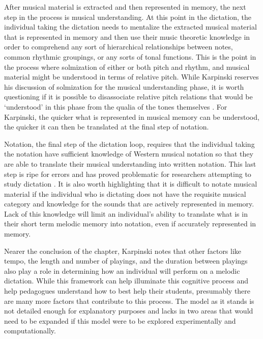 \documentclass[12pt,]{book}
\begin{document}
After musical material is extracted and then represented in memory, the next step in the process is musical understanding.
At this point in the dictation, the individual taking the dictation needs to mentalize the extracted musical material that is represented in memory and then use their music theoretic knowledge in order to comprehend any sort of hierarchical relationships between notes, common rhythmic groupings, or any sorts of tonal functions.
This is the point in the process where solmization of either or both pitch and rhythm, and musical material might be understood in terms of relative pitch.
While Karpinski reserves his discussion of solmization for the musical understanding phase, it is worth questioning if it is possible to disassociate relative pitch relations that would be `understood' in this phase from the qualia of the tones themselves \citep{arthurPerceptualStudyScaledegree2018}.
For Karpinski, the quicker what is represented in musical memory can be understood, the quicker it can then be translated at the final step of notation.

Notation, the final step of the dictation loop, requires that the individual taking the notation have sufficient knowledge of Western musical notation so that they are able to translate their musical understanding into written notation.
This last step is ripe for errors and has proved problematic for researchers attempting to study dictation \citep{taylorStrategiesMemoryShort1983, klonoskiImprovingDictationAuralSkills2006}.
It is also worth highlighting that it is difficult to notate musical material if the individual who is dictating does not have the requisite musical category and knowledge for the sounds that are actively represented in memory.
Lack of this knowledge will limit an individual's ability to translate what is in their short term melodic memory into notation, even if accurately represented in memory.

Nearer the conclusion of the chapter, Karpinski notes that other factors like tempo, the length and number of playings, and the duration between playings also play a role in determining how an individual will perform on a melodic dictation.
While this framework can help illuminate this cognitive process and help pedagogues understand how to best help their students, presumably there are many more factors that contribute to this process.
The model as it stands is not detailed enough for explanatory purposes and lacks in two areas that would need to be expanded if this model were to be explored experimentally and computationally.
\end{document}
